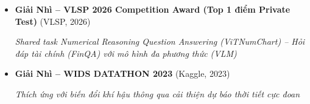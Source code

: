 

\begin{itemize}
  \item \textbf{Giải Nhì -- VLSP 2026 Competition Award (Top 1 điểm Private Test)} (VLSP, 2026)

  \textit{Shared task Numerical Reasoning Question Answering (ViTNumChart) -- Hỏi đáp tài chính (FinQA) với mô hình đa phương thức (VLM)}

  \item \textbf{Giải Nhì -- WIDS DATATHON 2023} (Kaggle, 2023)

  \textit{Thích ứng với biến đổi khí hậu thông qua cải thiện dự báo thời tiết cực đoan}
\end{itemize}


